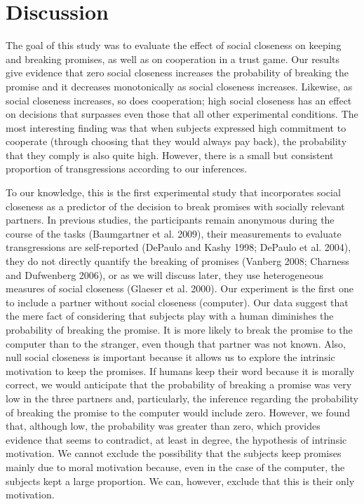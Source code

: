 \documentclass[smallextended]{svjour3}       %
\begin{document}
\hypertarget{discussion}{%
\section{Discussion}\label{discussion}}

The goal of this study was to evaluate the effect of social closeness on
keeping and breaking promises, as well as on cooperation in a trust
game. Our results give evidence that zero social closeness increases the
probability of breaking the promise and it decreases monotonically as
social closeness increases. Likewise, as social closeness increases, so
does cooperation; high social closeness has an effect on decisions that
surpasses even those that all other experimental conditions. The most
interesting finding was that when subjects expressed high commitment to
cooperate (through choosing that they would always pay back), the
probability that they comply is also quite high. However, there is a
small but consistent proportion of transgressions according to our
inferences.

To our knowledge, this is the first experimental study that incorporates
social closeness as a predictor of the decision to break promises with
socially relevant partners. In previous studies, the participants remain
anonymous during the course of the tasks (Baumgartner et al. 2009),
their measurements to evaluate transgressions are self-reported (DePaulo
and Kashy 1998; DePaulo et al. 2004), they do not directly quantify the
breaking of promises (Vanberg 2008; Charness and Dufwenberg 2006), or as
we will discuss later, they use heterogeneous measures of social
closeness (Glaeser et al. 2000). Our experiment is the first one to
include a partner without social closeness (computer). Our data suggest
that the mere fact of considering that subjects play with a human
diminishes the probability of breaking the promise. It is more likely to
break the promise to the computer than to the stranger, even though that
partner was not known. Also, null social closeness is important because
it allows us to explore the intrinsic motivation to keep the promises.
If humans keep their word because it is morally correct, we would
anticipate that the probability of breaking a promise was very low in
the three partners and, particularly, the inference regarding the
probability of breaking the promise to the computer would include zero.
However, we found that, although low, the probability was greater than
zero, which provides evidence that seems to contradict, at least in
degree, the hypothesis of intrinsic motivation. We cannot exclude the
possibility that the subjects keep promises mainly due to moral
motivation because, even in the case of the computer, the subjects kept
a large proportion. We can, however, exclude that this is their only
motivation.
\end{document}
